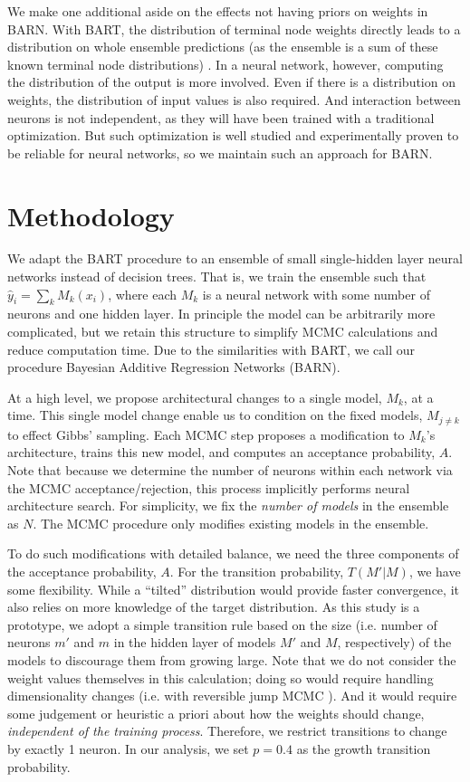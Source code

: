 \documentclass[12pt]{article}
\begin{document}
We make one additional aside on the effects not having priors on weights in BARN.  With BART, the distribution of terminal node weights directly leads to a distribution on whole ensemble predictions (as the ensemble is a sum of these known terminal node distributions) \cite{chipman2010bart}.  In a neural network, however, computing the distribution of the output is more involved.  Even if there is a distribution on weights, the distribution of input values is also required.  And interaction between neurons is not independent, as they will have been trained with a traditional optimization.  But such optimization is well studied and experimentally proven to be reliable \cite{kingma2014adam} for neural networks, so we maintain such an approach for BARN.

\section{Methodology}\label{sec:method}

We adapt the BART procedure \cite{chipman2010bart} to an ensemble of small single-hidden layer neural networks instead of decision trees.  That is, we train the ensemble such that $\hat{y}_i = \sum_k M_k(x_i)$, where each $M_k$ is a neural network with some number of neurons and one hidden layer.  In principle the model can be arbitrarily more complicated, but we retain this structure to simplify MCMC calculations and reduce computation time.  Due to the similarities with BART, we call our procedure Bayesian Additive Regression Networks (BARN).

At a high level, we propose architectural changes to a single model, $M_k$, at a time.  This single model change enable us to condition on the fixed models, $M_{j\neq k}$ to effect Gibbs' sampling.  Each MCMC step proposes a modification to $M_k$'s architecture, trains this new model, and computes an acceptance probability, $A$.  Note that because we determine the number of neurons within each network via the MCMC acceptance/rejection, this process implicitly performs neural architecture search.  For simplicity, we fix the \emph{number of models} in the ensemble as $N$.  The MCMC procedure only modifies existing models in the ensemble.

To do such modifications with detailed balance, we need the three components of the acceptance probability, $A$.  For the transition probability, $T(M'|M)$, we have some flexibility.  While a ``tilted'' distribution would provide faster convergence, it also relies on more knowledge of the target distribution.  As this study is a prototype, we adopt a simple transition rule based on the size (i.e. number of neurons $m'$ and $m$ in the hidden layer of models $M'$ and $M$, respectively) of the models to discourage them from growing large.  Note that we do not consider the weight values themselves in this calculation; doing so would require handling dimensionality changes (i.e. with reversible jump MCMC \cite{green1995reversible}).  And it would require some judgement or heuristic a priori about how the weights should change, \emph{independent of the training process}.  Therefore, we restrict transitions to change by exactly 1 neuron.  In our analysis, we set $p=0.4$ as the growth transition probability.
\end{document}
